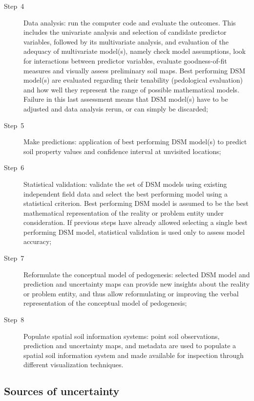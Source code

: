 \begin{description}
  \item [{Step~4}] Data analysis: run the computer code and evaluate the 
  outcomes. This includes the univariate analysis and selection of candidate 
  predictor variables, followed by its multivariate analysis, and evaluation of
  the adequacy of multivariate model(s), namely check model assumptions, look 
  for interactions between predictor variables, evaluate goodness-of-fit 
  measures and visually assess preliminary soil maps. Best performing DSM 
  model(s) are evaluated regarding their tenability (pedological evaluation) 
  and how well they represent the range of possible mathematical models. 
  Failure in this last assessment means that DSM model(s) have to be adjusted 
  and data analysis rerun, or can simply be discarded;

  \item [{Step~5}] Make predictions: application of best performing DSM model(s)
  to predict soil property values and confidence interval at unvisited locations;

  \item [{Step~6}] Statistical validation: validate the set of DSM models using
  existing independent field data and select the best performing model using a 
  statistical criterion. Best performing DSM model is assumed to be the best 
  mathematical representation of the reality or problem entity under 
  consideration. If previous steps have already allowed selecting a single best 
  performing DSM model, statistical validation is used only to assess model 
  accuracy;
  
  \item [{Step~7}] Reformulate the conceptual model of pedogenesis: selected 
  DSM model and prediction and uncertainty maps can provide new insights about 
  the reality or problem entity, and thus allow reformulating or improving the 
  verbal representation of the conceptual model of pedogenesis;
  
  \item [{Step~8}] Populate spatial soil information systems: point soil 
  observations, prediction and uncertainty maps, and metadata are used to 
  populate a spatial soil information system and made available for inspection 
  through different visualization techniques.
\end{description}

\subsection{Sources of uncertainty}


